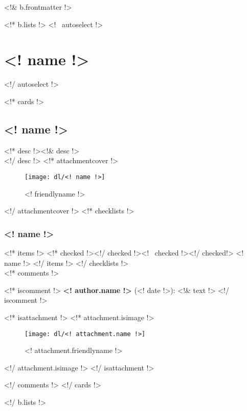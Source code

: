 



\renewcommand{\chaptertitle}{<! b.title !>}
\renewcommand{\today}{FTC Notebook 2015-2016}
\renewcommand{\sectiontitle}{Revision <! b.lastmodified !>}

\setcounter{chapter}{1}
\setcounter{page}{1}
\renewcommand\contentsname{Table of Contents}
\setcounter{tocdepth}{2}
\renewcommand{\sectiontitle}{Table of Contents}
\tableofcontents
\renewcommand{\thesection}{}
\cleardoublepage

<!& b.frontmatter !>

\cleardoublepage
\color{black}

\cleardoublepage
\renewcommand{\chaptertitle}{Engineering Section}
\renewcommand{\today}{\mbox{}}
\renewcommand{\sectiontitle}{Directly from Trello}

<!* b.lists !>
<!~ autoselect !>\section{<! name !>}<!/ autoselect !>

<!* cards !>
\subsection{<! name !>}
<!* desc !><!& desc !>\\<!/ desc !>
<!* attachmentcover !>
\begin{figure}[htbp]
  \centering
  \texttt{[image: dl/<! name !>]}
  \caption[]{<! friendlyname !>}
  \label{fig:<! name !>}
\end{figure}
<!/ attachmentcover !>
<!* checklists !>
\subsubsection{<! name !>}
<!* items !>
<!* checked !>\boxchecked<!/ checked !><!~ checked !>\boxunchecked<!/ checked!> <! name !>
<!/ items !>
<!/ checklists !>\mbox{}\\


<!* comments !>

<!* iscomment !>
{\bf <! author.name !>} {\color{darkgray} (<! date !>)}: <!& text !>
<!/ iscomment !>

<!* isattachment !>
<!* attachment.isimage !>
\begin{figure}[H]
  \centering
  \texttt{[image: dl/<! attachment.name !>]}
  \caption[]{<! attachment.friendlyname !>}
  \label{fig:<! attachment.name !>}
\end{figure}
<!/ attachment.isimage !>
<!/ isattachment !>

<!/ comments !>
\newpage
\clearpage
<!/ cards !>

<!/ b.lists !>



